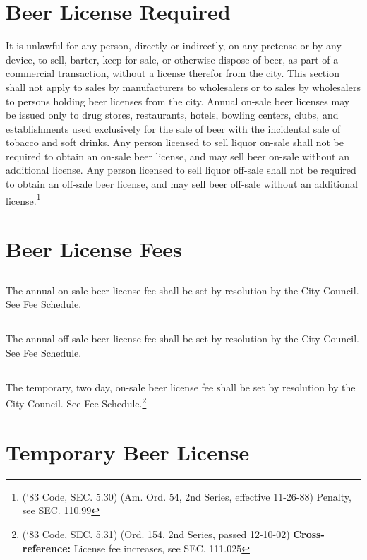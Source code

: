 \section{Beer License Required}
It is unlawful for any person, directly or indirectly, on any pretense or by any device, to sell, barter, keep for sale, or otherwise dispose of beer, as part of a commercial transaction, without a license therefor from the city. This section shall not apply to sales by manufacturers to wholesalers or to sales by wholesalers to persons holding beer licenses from the city.  Annual on-sale beer licenses may be issued only to drug stores, restaurants, hotels, bowling centers, clubs, and establishments used exclusively for the sale of beer with the incidental sale of tobacco and soft drinks.  Any person licensed to sell liquor on-sale shall not be required to obtain an on-sale beer license, and may sell beer on-sale without an additional license.  Any person licensed to sell liquor off-sale shall not be required to obtain an off-sale beer license, and may sell beer off-sale without an additional license.\footnote{(‘83 Code, SEC. 5.30)  (Am. Ord. 54, 2nd Series, effective 11-26-88)  Penalty, see SEC. 110.99}

\section{Beer License Fees}
\subsection{}
The annual on-sale beer license fee shall be set by resolution by the City Council. See Fee Schedule.
\subsection{}
The annual off-sale beer license fee shall be set by resolution by the City Council. See Fee Schedule.
\subsection{}
The temporary, two day, on-sale beer license fee shall be set by resolution by the City Council. See Fee Schedule.\footnote{(‘83 Code, SEC. 5.31)  (Ord. 154, 2nd Series, passed 12-10-02) \textbf{Cross-reference:} License fee increases, see SEC. 111.025}

\section{Temporary Beer License}

